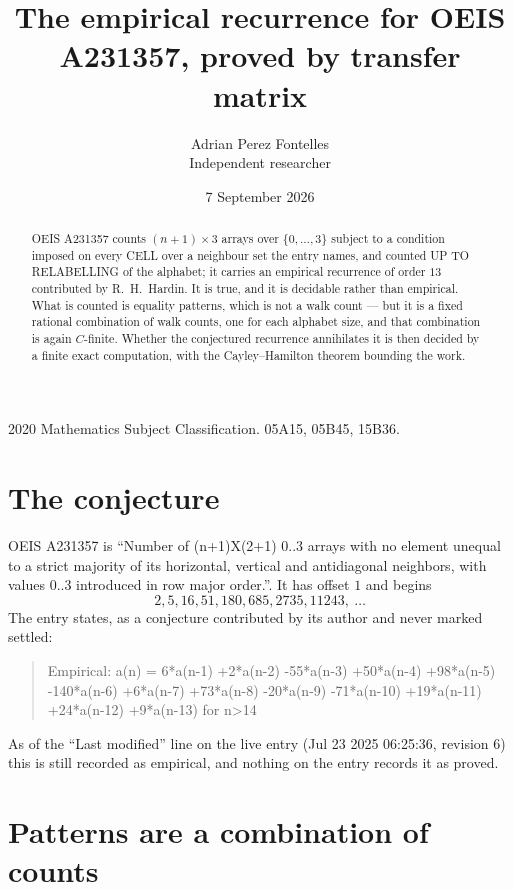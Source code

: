 \documentclass[11pt,a4paper]{article}
\title{The empirical recurrence for OEIS A231357, proved by transfer matrix}
\author{Adrian Perez Fontelles\\ \small Independent researcher}
\date{7 September 2026}
\theoremstyle{plain}
\theoremstyle{definition}
\begin{document}
\maketitle

\begin{abstract}
OEIS A231357 counts $(n+1)\times3$ arrays over $\{0,\dots,3\}$ subject to a condition imposed on
every CELL over a neighbour set the entry names, and counted UP TO RELABELLING of the
alphabet; it carries an empirical recurrence of order $13$ contributed by
R.~H.~Hardin. It is true, and it is decidable rather than empirical. What is counted is
equality patterns, which is not a walk count --- but it is a fixed rational combination of
walk counts, one for each alphabet size, and that combination is again $C$-finite. Whether the
conjectured recurrence annihilates it is then decided by a finite exact computation, with the
Cayley--Hamilton theorem bounding the work.
\end{abstract}

\noindent\small 2020 Mathematics Subject Classification. 05A15, 05B45, 15B36.\normalsize

\section{The conjecture}

OEIS A231357 is ``Number of (n+1)X(2+1) 0..3 arrays with no element unequal to a strict majority of its horizontal, vertical and antidiagonal neighbors, with values 0..3 introduced in row major order.''. It has offset $1$ and begins
\[
2, 5, 16, 51, 180, 685, 2735, 11243,\ \dots
\]
The entry states, as a conjecture contributed by its author and never marked settled:
\begin{quote}
Empirical: a(n) = 6*a(n-1) +2*a(n-2) -55*a(n-3) +50*a(n-4) +98*a(n-5) -140*a(n-6) +6*a(n-7) +73*a(n-8) -20*a(n-9) -71*a(n-10) +19*a(n-11) +24*a(n-12) +9*a(n-13) for n>14
\end{quote}
As of the ``Last modified'' line on the live entry (Jul 23 2025 06:25:36, revision 6) this is still
recorded as empirical, and nothing on the entry records it as proved.

\section{Patterns are a combination of counts}
\end{document}

